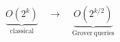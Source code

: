 \documentclass[border=6pt]{standalone}
\begin{document}
\color{ptitnavy}
\(\displaystyle \underbrace{O(2^k)}_{\mathrm{classical}}\quad\longrightarrow\quad\underbrace{O(2^{k/2})}_{\mathrm{Grover\ queries}}\)
\end{document}
